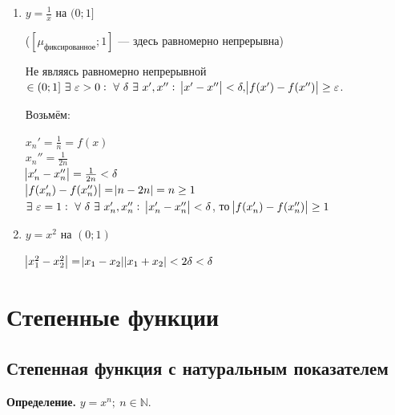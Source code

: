 \documentclass{article}
\begin{document}
    \begin{enumerate}
        \item \( y = \frac{1}{x} \) на \( (0; 1] \)

        (\( [\mu_{\textrm{фиксированное}}; 1] \) --- здесь равномерно непрерывна)
    
        Не являясь равномерно непрерывной \( \in (0; 1]\ \exists\ \varepsilon > 0:\ \forall\ \delta\ \exists\ x', x'':\ \abs{x' - x''} < \delta, \abs{f(x') - f(x'')} \geq \varepsilon \).
        
        Возьмём:
    
        \( x_n' = \frac{1}{n} = f(x) \)\\
        \( x_n'' = \frac{1}{2n} \)\\
        \( \abs{x_n' - x_n''} = \frac{1}{2n} < \delta \)\\
        \( \abs{f(x_n') - f(x_n'')} = \abs{n - 2n} = n \geq 1 \)\\
        \( \exists\ \varepsilon = 1:\ \forall\ \delta\ \exists\ x_n', x_n'':\ \abs{x_n' - x_n''} < \delta \), то \( \abs{f(x_n') - f(x_n'')} \geq 1\)
        
        \item \( y = x^2 \) на \( (0; 1) \)
        
        \( \abs{x_1^2 - x_2^2} = \abs{x_1 - x_2}\abs{x_1 + x_2} < 2\delta < \delta \)
    \end{enumerate}
    
    \section{Степенные функции}

    \subsection{Степенная функция с натуральным показателем}

    \textbf{Определение.} \(y = x^n;\ n \in \mathbb{N}\).
    
\end{document}
